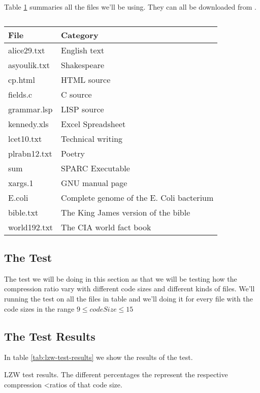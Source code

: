\begin{refsection}
Table \ref{tab:corp-files} summaries all the files we'll be using. They can all be
downloaded from \cite{powell:desc-corp}.

\begin{table}
  \centering
  \begin{tabular}{ll}
    \toprule
    File & Category \\
    \midrule
    alice29.txt & English text \\
    asyoulik.txt & Shakespeare \\
    cp.html & HTML source \\
    fields.c & C source \\
    grammar.lsp & LISP source \\
    kennedy.xls & Excel Spreadsheet \\
    lcet10.txt & Technical writing \\
    plrabn12.txt & Poetry \\
    sum & SPARC Executable \\
    xargs.1 & GNU manual page \\
    E.coli & Complete genome of the E. Coli bacterium \\
    bible.txt & The King James version of the bible \\
    world192.txt & The CIA world fact book \\
    \bottomrule
  \end{tabular}
  \caption{}
  \label{tab:corp-files}
\end{table}

\subsection{The Test}

The test we will be doing in this section as that we will be testing
how the compression ratio vary with different code sizes and different
kinds of files. We'll running the test on all the files in table and
we'll doing it for every file with the code sizes in the range $9 \leq
codeSize \leq 15$

\subsection{The Test Results}

In table \ref{tab:lzw-test-results} we show the results of the test.

\begin{table}
  \scriptsize
  \centering
  
  \caption{LZW test results. The different percentages the represent the respective compression <ratios of that code size.}
  \label{tab:lzw-test-results}
\end{table}


\end{refsection}
